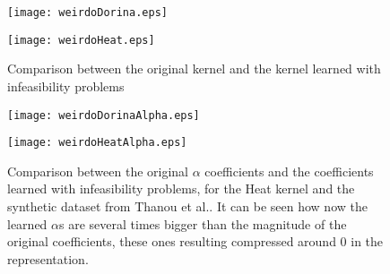 \begin{figure}
  \centering
  \begin{minipage}[c]{.8\textwidth}
    \texttt{[image: weirdoDorina.eps]}
  \end{minipage}
  \begin{minipage}[c]{.8\textwidth}
    \texttt{[image: weirdoHeat.eps]}
  \end{minipage}
  \caption{Comparison between the original kernel and the kernel learned with infeasibility problems}
  \label{fig:kernelWeirdo}
\end{figure}

\begin{figure}
  \centering
  \begin{minipage}[c]{.8\textwidth}
    \texttt{[image: weirdoDorinaAlpha.eps]}
  \end{minipage}
  \begin{minipage}[c]{.8\textwidth}
    \texttt{[image: weirdoHeatAlpha.eps]}
  \end{minipage}
  \caption{Comparison between the original $\alpha$ coefficients and the coefficients learned with infeasibility problems, for the Heat kernel and the synthetic dataset from Thanou et al.. It can be seen how now the learned $\alpha$s are several times bigger than the magnitude of the original coefficients, these ones resulting compressed around $0$ in the representation.}
  \label{fig:alphaWeirdo}
\end{figure}


